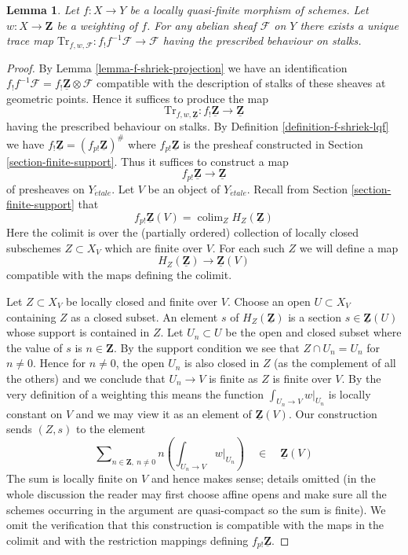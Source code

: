 \documentclass{stacks-project}
\theoremstyle{plain}
\newtheorem{lemma}[subsection]{Lemma}
\theoremstyle{definition}
\theoremstyle{remark}
\numberwithin{equation}{subsection}
\def\colim{\mathop{\mathrm{colim}}\nolimits}
\def\etale{{\acute{e}tale}}
\begin{document}
\begin{lemma}
\label{lemma-trace-map-exists}
Let $f : X \to Y$ be a locally quasi-finite morphism of schemes.
Let $w : X \to \mathbf{Z}$ be a weighting of $f$. For any abelian sheaf
$\mathcal{F}$ on $Y$ there exists a unique trace map
$\text{Tr}_{f, w, \mathcal{F}} : f_!f^{-1}\mathcal{F} \to \mathcal{F}$
having the prescribed behaviour on stalks.
\end{lemma}

\begin{proof}
By Lemma \ref{lemma-f-shriek-projection} we have an identification
$f_!f^{-1}\mathcal{F} = f_!\underline{\mathbf{Z}} \otimes \mathcal{F}$
compatible with the description of stalks of these sheaves at
geometric points. Hence it suffices to produce the map
$$
\text{Tr}_{f, w, \underline{\mathbf{Z}}} :
f_!\underline{\mathbf{Z}}
\longrightarrow
\underline{\mathbf{Z}}
$$
having the prescribed behaviour on stalks. By
Definition \ref{definition-f-shriek-lqf} we have
$f_!\underline{\mathbf{Z}} = (f_{p!}\underline{\mathbf{Z}})^\#$
where $f_{p!}\underline{\mathbf{Z}}$ is the presheaf
constructed in Section \ref{section-finite-support}.
Thus it suffices to construct a map
$$
f_{p!}\underline{\mathbf{Z}} \longrightarrow \underline{\mathbf{Z}}
$$
of presheaves on $Y_\etale$. Let $V$ be an object of $Y_\etale$.
Recall from Section \ref{section-finite-support} that
$$
f_{p!}\underline{\mathbf{Z}}(V) = \colim_Z H_Z(\underline{\mathbf{Z}})
$$
Here the colimit is over the (partially ordered) collection of locally closed
subschemes $Z \subset X_V$ which are finite over $V$. For each such
$Z$ we will define a map
$$
H_Z(\underline{\mathbf{Z}}) \longrightarrow \underline{\mathbf{Z}}(V)
$$
compatible with the maps defining the colimit.

\medskip\noindent
Let $Z \subset X_V$ be locally closed and finite over $V$.
Choose an open $U \subset X_V$ containing $Z$ as a closed subset.
An element $s$ of $H_Z(\underline{\mathbf{Z}})$ is a section
$s \in \underline{\mathbf{Z}}(U)$ whose support is contained in $Z$.
Let $U_n \subset U$ be the open and closed subset where the value
of $s$ is $n \in \mathbf{Z}$. By the support condition we see that
$Z \cap U_n = U_n$ for $n \not = 0$. Hence for $n \not = 0$, the open
$U_n$ is also closed in $Z$ (as the complement of all the others)
and we conclude that $U_n \to V$ is finite as $Z$ is finite over $V$.
By the very definition of a weighting this means the
function $\int_{U_n \to V} w|_{U_n}$ is locally constant on $V$
and we may view it as an element of $\underline{\mathbf{Z}}(V)$.
Our construction sends $(Z, s)$ to the element
$$
\sum\nolimits_{n \in \mathbf{Z},\ n \not = 0}
n \left(\int_{U_n \to V} w|_{U_n}\right)
\quad \in \quad \underline{\mathbf{Z}}(V)
$$
The sum is locally finite on $V$ and hence makes sense; details omitted
(in the whole discussion the reader may first choose affine opens and
make sure all the schemes occurring in the argument are quasi-compact so
the sum is finite). We omit the verification that this construction
is compatible with the maps in the colimit and with the restriction
mappings defining $f_{p!}\underline{\mathbf{Z}}$.


\end{proof}
\end{document}
